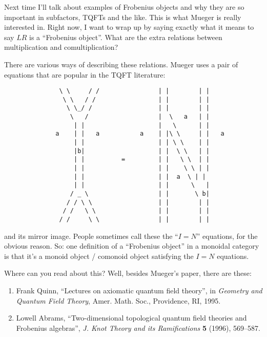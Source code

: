 \documentclass{article}
\begin{document}
Next time I'll talk about examples of Frobenius objects and why they are
so important in subfactors, TQFTs and the like. This is what Mueger is
really interested in. Right now, I want to wrap up by saying exactly
what it means to say \(LR\) is a ``Frobenius object''. What are the
extra relations between multiplication and comultiplication?

There are various ways of describing these relations. Mueger uses a pair
of equations that are popular in the TQFT literature:

\begin{verbatim}
               \ \     / /                | |        | |
                \ \   / /                 | |        | |
                 \ \_/ /                  | |        | |
                  \   /                   |  \   a   | |
                   | |                    |   \      | |
              a    | |   a           a    | |\ \     | |   a
                   | |                    | | \ \    | |
                   |b|                    | |  \ \   | |
                   | |          =         | |   \ \  | |
                   | |                    | |    \ \ | |
                   | |                    | |  a  \ | |
                   | |                    | |      \   |
                  / _ \                   | |       \ b|
                 / / \ \                  | |        | |
                / /   \ \                 | |        | | 
               / /     \ \                | |        | |
\end{verbatim}

and its mirror image. People sometimes call these the ``\(I = N\)''
equations, for the obvious reason. So: one definition of a ``Frobenius
object'' in a monoidal category is that it's a monoid object / comonoid
object satisfying the \(I = N\) equations.

Where can you read about this? Well, besides Mueger's paper, there are
these:

\begin{enumerate}
\def\labelenumi{\arabic{enumi})}
\setcounter{enumi}{3}
\item
  Frank Quinn, ``Lectures on axiomatic quantum field theory'', in
  \emph{Geometry and Quantum Field Theory}, Amer. Math. Soc.,
  Providence, RI, 1995.
\item
  Lowell Abrams, ``Two-dimensional topological quantum field theories
  and Frobenius algebras'', \emph{J. Knot Theory and its Ramifications}
  \textbf{5} (1996), 569--587.
\end{enumerate}
\end{document}
